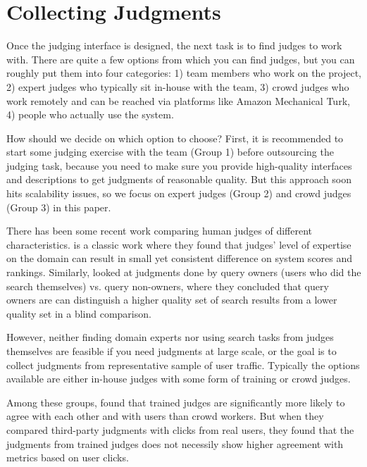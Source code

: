 \section{Collecting Judgments}

Once the judging interface is designed, the next task is to find judges to work with. There are quite a few options from which you can find judges, but you can roughly put them into four categories: 1) team members who work on the project, 2) expert judges who typically sit in-house with the team, 3) crowd judges who work remotely and can be reached via platforms like Amazon Mechanical Turk, 4) people who actually use the system. %

How should we decide on which option to choose? First, it is recommended to start some judging exercise with the team (Group 1) before outsourcing the judging task, because you need to make sure you provide high-quality interfaces and descriptions to get judgments of reasonable quality. But this approach soon hits scalability issues, so we focus on expert judges (Group 2) and crowd judges (Group 3) in this paper.

There has been some recent work comparing human judges of different characteristics. \cite{Bailey:2008} is a classic work where they found that judges' level of expertise on the domain can result in small yet consistent difference on system scores and rankings. Similarly, \cite{Chouldechova:2013} looked at judgments done by query owners (users who did the search themselves) vs. query non-owners, where they concluded that query owners are can distinguish a higher quality set of search results from a lower quality set in a blind comparison.

However, neither finding domain experts nor using search tasks from judges themselves are feasible if you need judgments at large scale, or the goal is to collect judgments from representative sample of user traffic. Typically the options available are either in-house judges with some form of training or crowd judges. 

Among these groups,  \cite{Kazai:2013} found that trained judges are significantly more likely to agree with each other and with users than crowd workers. But when they compared third-party judgments with clicks from real users, they found that the judgments from trained judges does not necessily show higher agreement with metrics based on user clicks.%

